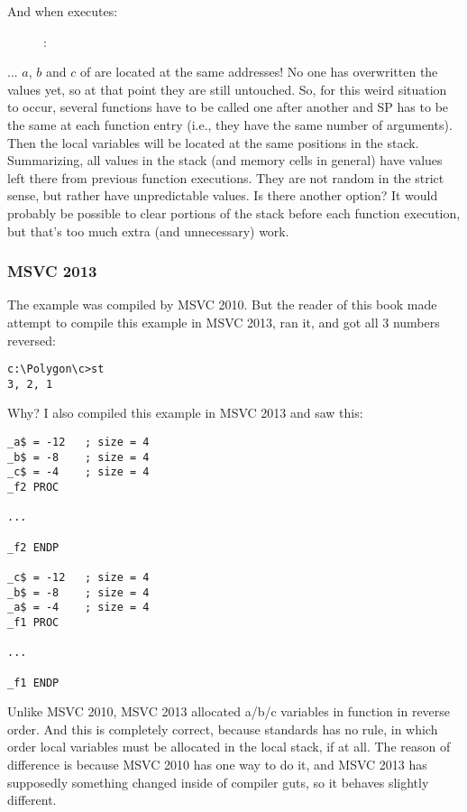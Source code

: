\clearpage
And when  executes:

\begin{figure}[H]
\centering
{}
\caption{\olly: }
\label{fig:stack_noise_olly2}
\end{figure}

... $a$, $b$ and $c$ of  are located at the same addresses!
No one has overwritten the values yet, so at that point they are still untouched.
So, for this weird situation to occur, several functions have to be called one after another and
\ac{SP} has to be the same at each function entry (i.e., they have the same number
of arguments). Then the local variables will be located at the same positions in the stack.
Summarizing, all values in the stack (and memory cells in general) have values left there from previous function executions.
They are not random in the strict sense, but rather have unpredictable values.
Is there another option?
It would probably be possible to clear portions of the stack before each function execution,
but that's too much extra (and unnecessary) work.

\subsubsection{MSVC 2013}

The example was compiled by MSVC 2010.
But the reader of this book made attempt to compile this example in MSVC 2013, ran it, and got all 3 numbers reversed:%

\begin{lstlisting}
c:\Polygon\c>st
3, 2, 1
\end{lstlisting}

Why?
I also compiled this example in MSVC 2013 and saw this:


\begin{lstlisting}[caption=MSVC 2013,style=customasmx86]
_a$ = -12	; size = 4
_b$ = -8	; size = 4
_c$ = -4	; size = 4
_f2	PROC

...

_f2	ENDP

_c$ = -12	; size = 4
_b$ = -8	; size = 4
_a$ = -4	; size = 4
_f1	PROC

...

_f1	ENDP
\end{lstlisting}

Unlike MSVC 2010, MSVC 2013 allocated a/b/c variables in function  in reverse order.%
And this is completely correct, because \CCpp standards has no rule, in which order local variables must be allocated in the local stack, if at all.
The reason of difference is because MSVC 2010 has one way to do it, and MSVC 2013 has supposedly something changed inside of compiler guts, so it behaves slightly different.

